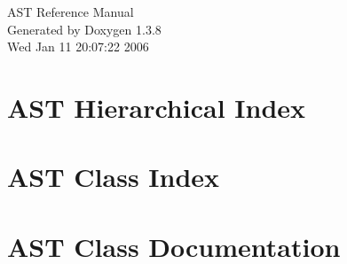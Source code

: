 \documentclass[a4paper]{book}
\begin{document}
\begin{titlepage}
\vspace*{7cm}
\begin{center}
{\Large AST Reference Manual}\\
\vspace*{1cm}
{\large Generated by Doxygen 1.3.8}\\
\vspace*{0.5cm}
{\small Wed Jan 11 20:07:22 2006}\\
\end{center}
\end{titlepage}
\clearemptydoublepage
{}
\tableofcontents
\clearemptydoublepage
{}
\chapter{AST Hierarchical Index}

\chapter{AST Class Index}

\chapter{AST Class Documentation}













\printindex
\end{document}
